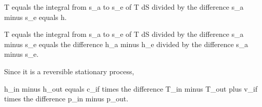 T equals the integral from s_a to s_e of T dS divided by the difference s_a minus s_e equals h.

T equals the integral from s_a to s_e of T dS divided by the difference s_a minus s_e equals the difference h_a minus h_e divided by the difference s_a minus s_e.

Since it is a reversible stationary process,

h_in minus h_out equals c_if times the difference T_in minus T_out plus v_if times the difference p_in minus p_out.